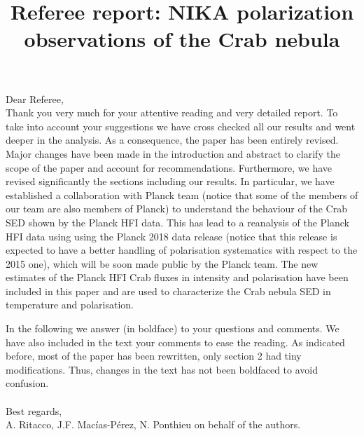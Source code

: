 \documentclass[12pt]{article}
\title{Referee report: NIKA polarization observations of the Crab nebula}
\begin{document}
\maketitle

\noindent Dear Referee,\\

Thank you very much for your attentive reading and very detailed report. 
To take into account your suggestions we have cross checked all our results
and went deeper in the analysis.
As a consequence, the paper has been entirely revised. Major changes have been made in the introduction and abstract to clarify the scope of the paper and account for
recommendations. Furthermore, we have revised significantly the sections including our results. In particular, we have established a collaboration with 
Planck team (notice that some of the members of our team are also members of Planck) to understand the behaviour of the Crab SED shown by the Planck HFI data. This has lead to a reanalysis of the Planck HFI data using using the Planck 2018 data release (notice that this release is expected to have a better handling of polarisation systematics with respect to the 2015 one), which will be soon made public by the Planck team.  The new estimates of the Planck HFI Crab fluxes in intensity and polarisation have been included in this paper and are used to characterize
the Crab nebula SED in temperature and polarisation.

In the following we answer (in boldface) to your questions and comments. 
We have also included in the text your comments to ease the reading.
As indicated before, most of the paper has been rewritten, only section 2 had tiny modifications. Thus, changes in the text has not been boldfaced to avoid confusion. \\  \\
Best regards,\\
A. Ritacco, J.F. Macías-Pérez, N. Ponthieu on behalf of the authors.
\end{document}

